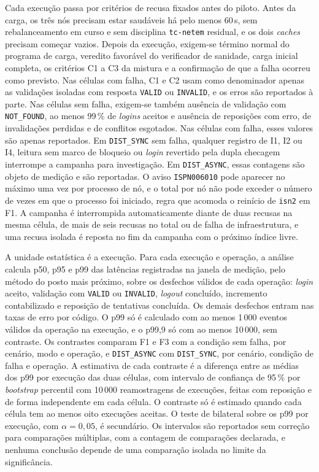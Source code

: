 Cada execução passa por critérios de recusa fixados antes do piloto. Antes da carga, os três nós precisam estar saudáveis há pelo menos 60\,s, sem rebalanceamento em curso e sem disciplina \texttt{tc-netem} residual, e os dois \emph{caches} precisam começar vazios. Depois da execução, exigem-se término normal do programa de carga, veredito favorável do verificador de sanidade, carga inicial completa, os critérios C1 a C3 da mistura e a confirmação de que a falha ocorreu como previsto. Nas células com falha, C1 e C2 usam como denominador apenas as validações isoladas com resposta \texttt{VALID} ou \texttt{INVALID}, e os erros são reportados à parte. Nas células sem falha, exigem-se também ausência de validação com \texttt{NOT\_FOUND}, ao menos 99\,\% de \emph{logins} aceitos e ausência de reposições com erro, de invalidações perdidas e de conflitos esgotados. Nas células com falha, esses valores são apenas reportados. Em \texttt{DIST\_SYNC} sem falha, qualquer registro de I1, I2 ou I4, leitura sem marco de bloqueio ou \emph{login} revertido pela dupla checagem interrompe a campanha para investigação. Em \texttt{DIST\_ASYNC}, essas contagens são objeto de medição e são reportadas. O aviso \texttt{ISPN006010} pode aparecer no máximo uma vez por processo de nó, e o total por nó não pode exceder o número de vezes em que o processo foi iniciado, regra que acomoda o reinício de \texttt{isn2} em F1. A campanha é interrompida automaticamente diante de duas recusas na mesma célula, de mais de seis recusas no total ou de falha de infraestrutura, e uma recusa isolada é reposta no fim da campanha com o próximo índice livre.

A unidade estatística é a execução. Para cada execução e operação, a análise calcula p50, p95 e p99 das latências registradas na janela de medição, pelo método do posto mais próximo, sobre os desfechos válidos de cada operação: \emph{login} aceito, validação com \texttt{VALID} ou \texttt{INVALID}, \emph{logout} concluído, incremento contabilizado e reposição de tentativas concluída. Os demais desfechos entram nas taxas de erro por código. O p99 só é calculado com ao menos 1\,000 eventos válidos da operação na execução, e o p99,9 só com ao menos 10\,000, sem contraste. Os contrastes comparam F1 e F3 com a condição sem falha, por cenário, modo e operação, e \texttt{DIST\_ASYNC} com \texttt{DIST\_SYNC}, por cenário, condição de falha e operação. A estimativa de cada contraste é a diferença entre as médias dos p99 por execução das duas células, com intervalo de confiança de 95\,\% por \emph{bootstrap} percentil \citep{efron_tibshirani_bootstrap_1993} com 10\,000 reamostragens de execuções, feitas com reposição e de forma independente em cada célula. O contraste só é estimado quando cada célula tem ao menos oito execuções aceitas. O teste de \citet{mann_whitney_1947} bilateral sobre os p99 por execução, com $\alpha = 0{,}05$, é secundário. Os intervalos são reportados sem correção para comparações múltiplas, com a contagem de comparações declarada, e nenhuma conclusão depende de uma comparação isolada no limite da significância.

